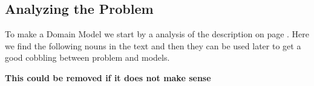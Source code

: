\subsection{Analyzing the Problem}
To make a Domain Model we start by a analysis of the description on page \pageref{sc:problemdescription}. Here we find the following nouns in the text and then they can be used later to get a good cobbling between problem and models.

\textbf{This could be removed if it does not make sense}


